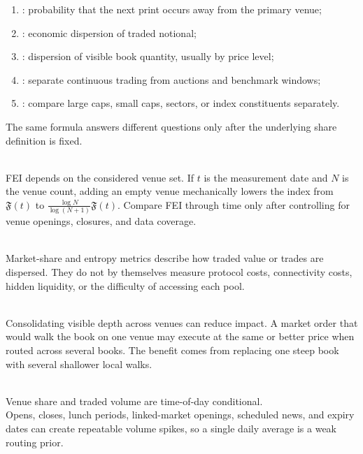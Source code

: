 \documentclass[a4paper,oneside,openany]{book}
\begin{document}
\begin{taxonomy} 
\begin{enumerate}[label=\roman*.]
\setlength{\itemsep}{0pt}
\item {}: probability that the next print occurs away from the primary venue;
\item {}: economic dispersion of traded notional;
\item {}: dispersion of visible book quantity, usually by price level;
\item {}: separate continuous trading from auctions and benchmark windows;
\item {}: compare large caps, small caps, sectors, or index constituents separately.
\end{enumerate}
The same formula answers different questions only after the underlying share definition is fixed.
\end{taxonomy}

\begin{caveat} \\
FEI depends on the considered venue set. If $t$ is the measurement date and $N$ is the venue count, adding an empty venue mechanically lowers the index from $\mathfrak{F}(t)$ to $\frac{\log N}{\log(N+1)}\mathfrak{F}(t)$. Compare FEI through time only after controlling for venue openings, closures, and data coverage.
\end{caveat}

\begin{caveat} \\
Market-share and entropy metrics describe how traded value or trades are dispersed. They do not by themselves measure protocol costs, connectivity costs, hidden liquidity, or the difficulty of accessing each pool.
\end{caveat}

\begin{mechanism} \\
Consolidating visible depth across venues can reduce impact. A market order that would walk the book on one venue may execute at the same or better price when routed across several books. The benefit comes from replacing one steep book with several shallower local walks.
\end{mechanism}

\begin{caveat} \\
Venue share and traded volume are time-of-day conditional.\\
Opens, closes, lunch periods, linked-market openings, scheduled news, and expiry dates can create repeatable volume spikes, so a single daily average is a weak routing prior.
\end{caveat}
\end{document}
